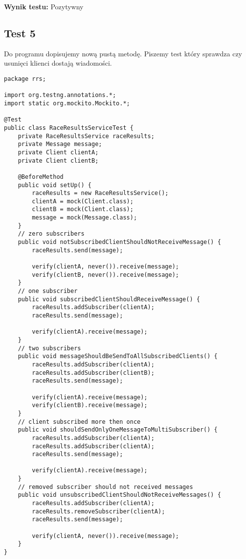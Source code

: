 \documentclass[a4paper,12pt,twoside]{article}
\begin{document}
\noindent
\textbf{Wynik testu: }{\color{green} Pozytywny}

\subsection{Test 5}
Do programu dopisujemy nową pustą metodę. Piszemy test który sprawdza czy usunięci klienci dostają wiadomości.

\begin{lstlisting}
package rrs;

import org.testng.annotations.*;
import static org.mockito.Mockito.*;

@Test
public class RaceResultsServiceTest {
    private RaceResultsService raceResults;
    private Message message;
    private Client clientA;
    private Client clientB;
    
    @BeforeMethod
    public void setUp() {
        raceResults = new RaceResultsService();
        clientA = mock(Client.class);
        clientB = mock(Client.class);
        message = mock(Message.class);
    }
    // zero subscribers
    public void notSubscribedClientShouldNotReceiveMessage() {
        raceResults.send(message);
        
        verify(clientA, never()).receive(message);
        verify(clientB, never()).receive(message);
    }
    // one subscriber
    public void subscribedClientShouldReceiveMessage() {
        raceResults.addSubscriber(clientA);
        raceResults.send(message);
        
        verify(clientA).receive(message);
    }
    // two subscribers
    public void messageShouldBeSendToAllSubscribedClients() {
        raceResults.addSubscriber(clientA);
        raceResults.addSubscriber(clientB);
        raceResults.send(message);
        
        verify(clientA).receive(message);
        verify(clientB).receive(message);
    }
    // client subscribed more then once
    public void shouldSendOnlyOneMessageToMultiSubscriber() {
        raceResults.addSubscriber(clientA);
        raceResults.addSubscriber(clientA);
        raceResults.send(message);
        
        verify(clientA).receive(message);
    }
    // removed subscriber should not received messages
    public void unsubscribedClientShouldNotReceiveMessages() {
        raceResults.addSubscriber(clientA);
        raceResults.removeSubscriber(clientA);
        raceResults.send(message);
        
        verify(clientA, never()).receive(message);
    }
}
\end{lstlisting}
\end{document}
